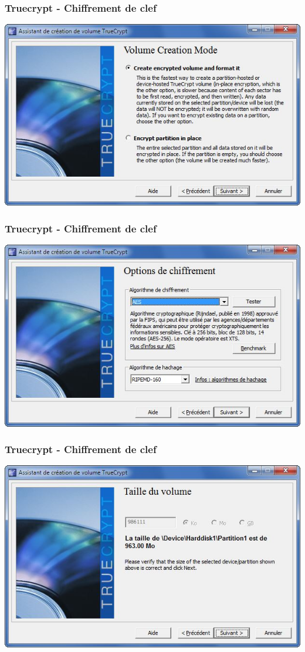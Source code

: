 \documentclass{beamer}
\begin{document}
\begin{frame}
\frametitle{Truecrypt - Chiffrement de clef}
\begin{center}
\includegraphics[scale=0.5] {./images/Truecrypt28.jpg} 
\end{center}
\end{frame}
\begin{frame}
\frametitle{Truecrypt - Chiffrement de clef}
\begin{center}
\includegraphics[scale=0.5] {./images/Truecrypt29.jpg} 
\end{center}
\end{frame}
\begin{frame}
\frametitle{Truecrypt - Chiffrement de clef}
\begin{center}
\includegraphics[scale=0.5] {./images/Truecrypt30.jpg} 
\end{center}
\end{frame}
\end{document}
